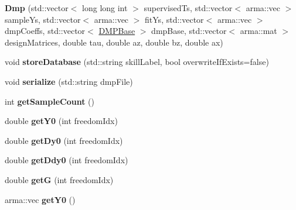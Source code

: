 \begin{DoxyCompactItemize}
\item 
{\bfseries Dmp} (std\+::vector$<$ long long int $>$ supervised\+Ts, std\+::vector$<$ arma\+::vec $>$ sample\+Ys, std\+::vector$<$ arma\+::vec $>$ fit\+Ys, std\+::vector$<$ arma\+::vec $>$ dmp\+Coeffs, std\+::vector$<$ \hyperlink{classkukadu_1_1DMPBase}{D\+M\+P\+Base} $>$ dmp\+Base, std\+::vector$<$ arma\+::mat $>$ design\+Matrices, double tau, double az, double bz, double ax)\hypertarget{classkukadu_1_1Dmp_a5734d44a7bb7b3cd124664bcaa2ce85d}{}\label{classkukadu_1_1Dmp_a5734d44a7bb7b3cd124664bcaa2ce85d}

\item 
void {\bfseries store\+Database} (std\+::string skill\+Label, bool overwrite\+If\+Exists=false)\hypertarget{classkukadu_1_1Dmp_a4fd82cb0c5f82cb7509565897fc79a73}{}\label{classkukadu_1_1Dmp_a4fd82cb0c5f82cb7509565897fc79a73}

\item 
void {\bfseries serialize} (std\+::string dmp\+File)\hypertarget{classkukadu_1_1Dmp_a67645036f7e1dfb7ff833b8149716c2d}{}\label{classkukadu_1_1Dmp_a67645036f7e1dfb7ff833b8149716c2d}

\item 
int {\bfseries get\+Sample\+Count} ()\hypertarget{classkukadu_1_1Dmp_ab81d2e2b6f51744caff8714824afb940}{}\label{classkukadu_1_1Dmp_ab81d2e2b6f51744caff8714824afb940}

\item 
double {\bfseries get\+Y0} (int freedom\+Idx)\hypertarget{classkukadu_1_1Dmp_ab5256cb887386b5fd48a88e60a14e1d6}{}\label{classkukadu_1_1Dmp_ab5256cb887386b5fd48a88e60a14e1d6}

\item 
double {\bfseries get\+Dy0} (int freedom\+Idx)\hypertarget{classkukadu_1_1Dmp_a1a552adfe0f620b5c34e05ecf56fd55f}{}\label{classkukadu_1_1Dmp_a1a552adfe0f620b5c34e05ecf56fd55f}

\item 
double {\bfseries get\+Ddy0} (int freedom\+Idx)\hypertarget{classkukadu_1_1Dmp_a7d16db0cc1e7aadb52e88b9ce88ed013}{}\label{classkukadu_1_1Dmp_a7d16db0cc1e7aadb52e88b9ce88ed013}

\item 
double {\bfseries getG} (int freedom\+Idx)\hypertarget{classkukadu_1_1Dmp_a1b7816ff8f66155afad0a50f9cf40ab0}{}\label{classkukadu_1_1Dmp_a1b7816ff8f66155afad0a50f9cf40ab0}

\item 
arma\+::vec {\bfseries get\+Y0} ()\hypertarget{classkukadu_1_1Dmp_ae2c58371b5c9846a8d4e5a6145a5b4a8}{}\label{classkukadu_1_1Dmp_ae2c58371b5c9846a8d4e5a6145a5b4a8}


\end{DoxyCompactItemize}
